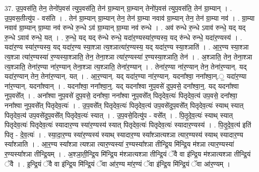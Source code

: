 \documentclass[17pt]{extarticle}
\begin{document}
37. उ॒प॒वस॑ति॒ तेन॒ तेनो॑प॒वस॑ त्युप॒वस॑ति॒ तेन॑ ग्रा॒म्यान् ग्रा॒म्यान् तेनो॑प॒वस॑ त्युप॒वस॑ति॒ तेन॑ ग्रा॒म्यान् । . उ॒प॒वस॒तीत्यु॑प - वस॑ति । . तेन॑ ग्रा॒म्यान् ग्रा॒म्यान् तेन॒ तेन॑ ग्रा॒म्या नवाव॑ ग्रा॒म्यान् तेन॒ तेन॑ ग्रा॒म्या नव॑ । . ग्रा॒म्या नवाव॑ ग्रा॒म्यान् ग्रा॒म्या नव॑ रुन्धे रु॒न्धे ऽव॑ ग्रा॒म्यान् ग्रा॒म्या नव॑ रुन्धे । . अव॑ रुन्धे रु॒न्धे ऽवाव॑ रुन्धे॒ यद् यद् रु॒न्धे ऽवाव॑ रुन्धे॒ यत् । . रु॒न्धे॒ यद् यद् रु॑न्धे रुन्धे॒ यदा॑र॒ण्यस्या॑र॒ण्यस्य॒ यद् रु॑न्धे रुन्धे॒ यदा॑र॒ण्यस्य॑ । . यदा॑र॒ण्य स्या॑र॒ण्यस्य॒ यद् यदा॑र॒ण्य स्या॒श्ञा त्य॒श्ञात्या॑र॒ण्यस्य॒ यद् यदा॑र॒ण्य स्या॒श्ञाति॑ । . आ॒र॒ण्य स्या॒श्ञा त्य॒श्ञा त्या॑र॒ण्यस्या॑ र॒ण्यस्या॒श्ञाति॒ तेन॒ तेना॒श्ञा त्या॑र॒ण्यस्या॑ र॒ण्यस्या॒श्ञाति॒ तेन॑ । . अ॒श्ञाति॒ तेन॒ तेना॒श्ञा त्य॒श्ञाति॒ तेना॑र॒ण्या ना॑र॒ण्यान् तेना॒श्ञा त्य॒श्ञाति॒ तेना॑र॒ण्यान् । . तेना॑र॒ण्या ना॑र॒ण्यान् तेन॒ तेना॑र॒ण्यान्. यद् यदा॑र॒ण्यान् तेन॒ तेना॑र॒ण्यान्. यत् । . आ॒र॒ण्यान्. यद् यदा॑र॒ण्या ना॑र॒ण्यान्. यदना᳚श्वा॒ नना᳚श्वा॒न्.॒ यदा॑र॒ण्या ना॑र॒ण्यान्. यदना᳚श्वान् । . यदना᳚श्वा॒ नना᳚श्वा॒न्॒. यद् यदना᳚श्वा नुप॒वसे॑ दुप॒वसे॒ दना᳚श्वा॒न्॒. यद् यदना᳚श्वा नुप॒वसे᳚त् । . अना᳚श्वा नुप॒वसे॑ दुप॒वसे॒ दना᳚श्वा॒ नना᳚श्वा नुप॒वसे᳚त् पितृदेव॒त्यः॑ पितृदेव॒त्य॑ उप॒वसे॒ दना᳚श्वा॒ नना᳚श्वा नुप॒वसे᳚त् पितृदेव॒त्यः॑ । . उ॒प॒वसे᳚त् पितृदेव॒त्यः॑ पितृदेव॒त्य॑ उप॒वसे॑दुप॒वसे᳚त् पितृदेव॒त्यः॑ स्याथ् स्यात् पितृदेव॒त्य॑ उप॒वसे॑दुप॒वसे᳚त् पितृदेव॒त्यः॑ स्यात् । . उ॒प॒वसे॒दित्यु॑प - वसे᳚त् । . पि॒तृ॒दे॒व॒त्यः॑ स्याथ् स्यात् पितृदेव॒त्यः॑ पितृदेव॒त्यः॑ स्यादार॒ण्य स्या॑र॒ण्यस्य॑ स्यात् पितृदेव॒त्यः॑ पितृदेव॒त्यः॑ स्यादार॒ण्यस्य॑ । . पि॒तृ॒दे॒व॒त्य॑ इति॑ पितृ - दे॒व॒त्यः॑ । . स्या॒दा॒र॒ण्य स्या॑र॒ण्यस्य॑ स्याथ् स्यादार॒ण्य स्या᳚श्ञात्यश्ञा त्यार॒ण्यस्य॑ स्याथ् स्यादार॒ण्य स्या᳚श्ञाति । . आ॒र॒ण्य स्या᳚श्ञा त्यश्ञा त्यार॒ण्यस्या॑ र॒ण्यस्या᳚श्ञा तीन्द्रि॒य मि॑न्द्रि॒य म॑श्ञा त्यार॒ण्यस्या॑ र॒ण्यस्या᳚श्ञा तीन्द्रि॒यम् । . अ॒श्ञा॒ती॒न्द्रि॒य मि॑न्द्रि॒य म॑श्ञात्यश्ञा तीन्द्रि॒यं ॅवै वा इ॑न्द्रि॒य म॑श्ञात्यश्ञा तीन्द्रि॒यं ॅवै । . इ॒न्द्रि॒यं ॅवै वा इ॑न्द्रि॒य मि॑न्द्रि॒यं ॅवा आ॑र॒ण्य मा॑र॒ण्यं ॅवा इ॑न्द्रि॒य मि॑न्द्रि॒यं ॅवा आ॑र॒ण्यम् । \newline
\pagebreak
{}
\end{document}
